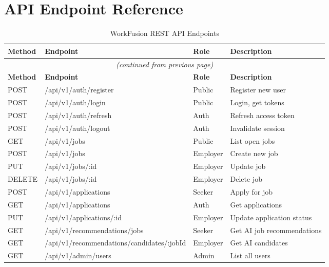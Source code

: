 \documentclass[12pt,a4paper,oneside]{report}
\begin{document}
\chapter{API Endpoint Reference}
\label{app:api}

\begin{longtable}{llll}
  \caption{WorkFusion REST API Endpoints} \\
  \toprule
  \textbf{Method} & \textbf{Endpoint} & \textbf{Role} & \textbf{Description} \\
  \midrule
  \endfirsthead
  \multicolumn{4}{c}{\textit{(continued from previous page)}} \\
  \toprule
  \textbf{Method} & \textbf{Endpoint} & \textbf{Role} & \textbf{Description} \\
  \midrule
  \endhead
  POST & /api/v1/auth/register      & Public   & Register new user \\
  POST & /api/v1/auth/login         & Public   & Login, get tokens \\
  POST & /api/v1/auth/refresh       & Auth     & Refresh access token \\
  POST & /api/v1/auth/logout        & Auth     & Invalidate session \\
  GET  & /api/v1/jobs               & Public   & List open jobs \\
  POST & /api/v1/jobs               & Employer & Create new job \\
  PUT  & /api/v1/jobs/:id           & Employer & Update job \\
  DELETE & /api/v1/jobs/:id         & Employer & Delete job \\
  POST & /api/v1/applications       & Seeker   & Apply for job \\
  GET  & /api/v1/applications       & Auth     & Get applications \\
  PUT  & /api/v1/applications/:id   & Employer & Update application status \\
  GET  & /api/v1/recommendations/jobs & Seeker & Get AI job recommendations \\
  GET  & /api/v1/recommendations/candidates/:jobId & Employer & Get AI candidates \\
  GET  & /api/v1/admin/users        & Admin    & List all users \\
  \bottomrule
\end{longtable}
\end{document}
